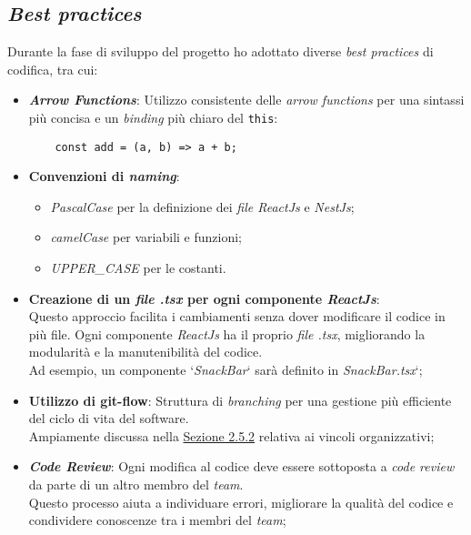 \subsection{\textit{Best practices}}
\label{sez:best-practices}

Durante la fase di sviluppo del progetto ho adottato diverse \textit{best practices} di codifica, tra cui:

\begin{itemize}
    \item \textbf{\textit{Arrow Functions}}: Utilizzo consistente delle \textit{arrow functions} per una sintassi più concisa e un \textit{binding} più chiaro del \texttt{this}:
    \begin{verbatim}
    const add = (a, b) => a + b;
     \end{verbatim}
    \item \textbf{Convenzioni di \textit{naming}}: 
    \begin{itemize}
        \item \textit{PascalCase} per la definizione dei \textit{file ReactJs} e \textit{NestJs};
        \item \textit{camelCase} per variabili e funzioni;
        \item \textit{UPPER\_CASE} per le costanti.
    \end{itemize}

    \item \textbf{Creazione di un \textit{file .tsx} per ogni componente \textit{ReactJs}}:\\
    Questo approccio facilita i cambiamenti senza dover modificare il codice in più file. 
    Ogni componente \textit{ReactJs} ha il proprio \textit{file .tsx}, migliorando la modularità e la manutenibilità del codice.\\
    Ad esempio, un componente ‘\textit{SnackBar}‘ sarà definito in \textit{SnackBar.tsx}‘;
    
    \item \textbf{Utilizzo di \gls{git-flow}}: Struttura di \textit{branching} per una gestione più efficiente del ciclo di vita del software.\\
    Ampiamente discussa nella {\hyperref[subsec:vincoli-organizzativi]{Sezione 2.5.2}} relativa ai vincoli organizzativi;

    \item \textbf{\textit{Code Review}}: Ogni modifica al codice deve essere sottoposta a \textit{code review} da parte di un altro membro del \textit{team}.\\
    Questo processo aiuta a individuare errori, migliorare la qualità del codice e condividere conoscenze tra i membri del \textit{team};    
\end{itemize}

